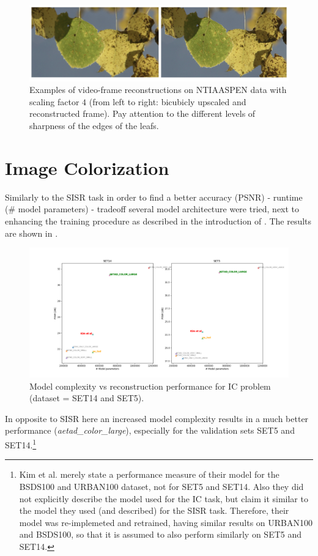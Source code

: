 \begin{figure}[!htbp]
	\centering
	\includegraphics[width=16cm]{figures/examples_vsr_4.png}
	\caption{Examples of video-frame reconstructions on NTIAASPEN data with scaling factor $4$ (from left to right: bicubicly upscaled and reconstructed frame). Pay attention to the different levels of sharpness of the edges of the leafs. }
  \label{fig:examples_vsr_4}
\end{figure}

\section{Image Colorization}
\label{sec:Experiments_IC}
Similarly to the \ac{SISR} task in order to find a better accuracy (PSNR) - runtime (\# model parameters) - tradeoff several model architecture were tried, next to enhancing the training procedure as described in the introduction of . The results are shown in . 

\begin{figure}[!htbp]
	\centering
	\includegraphics[width=18cm]{figures/psnr_complexity_ic}
	\caption{Model complexity vs reconstruction performance for \ac{IC}
	problem (dataset = SET14 and SET5).}
  \label{fig:psnr_complexity_ic}
\end{figure}

In opposite to \ac{SISR} here an increased model complexity results in a much better performance (\textit{aetad\_color\_large}), especially for the validation sets SET5 and SET14.\footnote{Kim et al. \cite{TAID} merely state a performance measure of their model for the BSDS100 and URBAN100 dataset, not for SET5 and SET14. Also they did not explicitly describe the model used for the \ac{IC} task, but claim it similar to the model they used (and described) for the \ac{SISR} task. Therefore, their model was re-implemeted and retrained, having similar results on URBAN100 and BSDS100, so that it is assumed to also perform similarly on SET5 and SET14. } 

